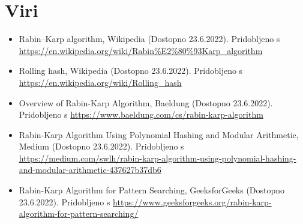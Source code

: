 \documentclass[12pt]{article}
\begin{document}
\section{Viri}
\begin{itemize}
  \item Rabin–Karp algorithm, Wikipedia (Dostopno 23.6.2022). Pridobljeno s \url{https://en.wikipedia.org/wiki/Rabin%E2%80%93Karp_algorithm}
  \item Rolling hash, Wikipedia (Dostopno 23.6.2022). Pridobljeno s \url{https://en.wikipedia.org/wiki/Rolling_hash}
  \item Overview of Rabin-Karp Algorithm, Baeldung (Dostopno 23.6.2022). Pridobljeno s \url{https://www.baeldung.com/cs/rabin-karp-algorithm }
  \item Rabin-Karp Algorithm Using Polynomial Hashing and Modular Arithmetic, Medium (Dostopno 23.6.2022). Pridobljeno s 
  \url{https://medium.com/swlh/rabin-karp-algorithm-using-polynomial-hashing-and-modular-arithmetic-437627b37db6}
  \item Rabin-Karp Algorithm for Pattern Searching, GeeksforGeeks (Dostopno 23.6.2022). 
  Pridobljeno s 
  \url{https://www.geeksforgeeks.org/rabin-karp-algorithm-for-pattern-searching/ }
\end{itemize}
\end{document}
